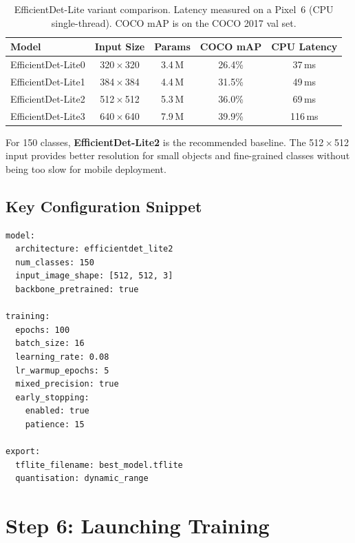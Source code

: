 \documentclass[11pt,a4paper]{article}
\begin{document}
\begin{table}[ht]
\centering
\caption{EfficientDet-Lite variant comparison. Latency measured on a Pixel~6
         (CPU single-thread). COCO mAP is on the COCO 2017 val set.}
\label{tab:models}
\begin{tabular}{@{}lcccc@{}}
\toprule
\textbf{Model}       & \textbf{Input Size} & \textbf{Params} & \textbf{COCO mAP} & \textbf{CPU Latency} \\
\midrule
EfficientDet-Lite0   & 320\,$\times$\,320  & 3.4\,M  & 26.4\%  & 37\,ms  \\
EfficientDet-Lite1   & 384\,$\times$\,384  & 4.4\,M  & 31.5\%  & 49\,ms  \\
EfficientDet-Lite2   & 512\,$\times$\,512  & 5.3\,M  & 36.0\%  & 69\,ms  \\
EfficientDet-Lite3   & 640\,$\times$\,640  & 7.9\,M  & 39.9\%  & 116\,ms \\
\bottomrule
\end{tabular}
\end{table}

For 150 classes, \textbf{EfficientDet-Lite2} is the recommended baseline.
The 512\,$\times$\,512 input provides better resolution for small objects and
fine-grained classes without being too slow for mobile deployment.

\subsection{Key Configuration Snippet}

\begin{lstlisting}[style=yaml, caption={training\_config.yaml (abridged)}]
model:
  architecture: efficientdet_lite2
  num_classes: 150
  input_image_shape: [512, 512, 3]
  backbone_pretrained: true

training:
  epochs: 100
  batch_size: 16
  learning_rate: 0.08
  lr_warmup_epochs: 5
  mixed_precision: true
  early_stopping:
    enabled: true
    patience: 15

export:
  tflite_filename: best_model.tflite
  quantisation: dynamic_range
\end{lstlisting}

\section{Step 6: Launching Training}
\end{document}
